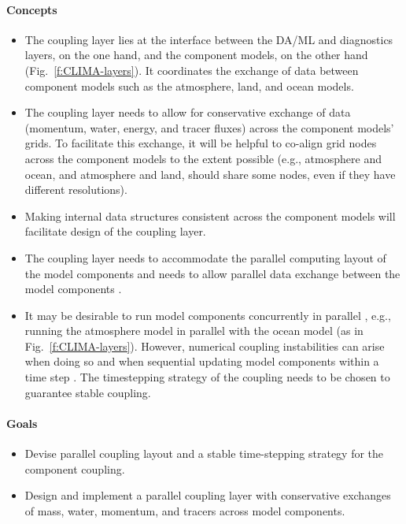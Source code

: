 \documentclass{article}
\begin{document}
\paragraph{Concepts}
\begin{itemize}
    \item The coupling layer lies at the interface between the DA/ML and diagnostics layers, on the one hand, and the component models, on the other hand (Fig.~\ref{f:CLIMA-layers}). It coordinates the exchange of data between component models such as the atmosphere, land, and ocean models.  
    \item The coupling layer needs to allow for conservative exchange of data (momentum, water, energy, and tracer fluxes) across the component models' grids. To facilitate this exchange, it will be helpful to co-align grid nodes across the component models to the extent possible (e.g., atmosphere and ocean, and atmosphere and land, should share some nodes, even if they have different resolutions).
    \item Making internal data structures consistent across the component models will facilitate design of the coupling layer. 
    \item The coupling layer needs to accommodate the parallel computing layout of the model components and needs to allow parallel data exchange between the model components \citep[e.g.,][]{Larson05a}. 
    \item It may be desirable to run model components concurrently in parallel \citep{Balaji16a}, e.g., running the atmosphere model in parallel with the ocean model (as in Fig.~\ref{f:CLIMA-layers}). However, numerical coupling instabilities can arise when doing so and when sequential updating model components within a time step \citep{Hallberg14a}. The timestepping strategy of the coupling needs to be chosen to guarantee stable coupling. 
\end{itemize}

\paragraph{Goals}
\begin{itemize}
    \item Devise parallel coupling layout and a stable time-stepping strategy for the component coupling.
    \item Design and implement a parallel coupling layer with conservative exchanges of mass, water, momentum, and tracers across model components.  
\end{itemize}
\end{document}
